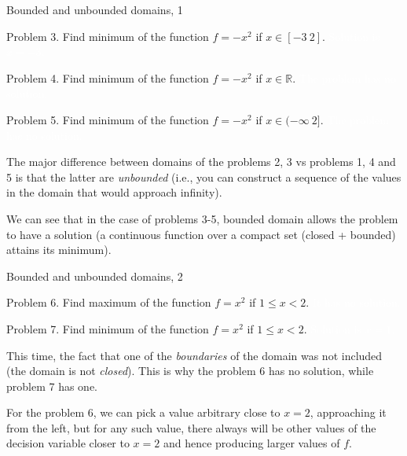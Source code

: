 \documentclass{beamer}
\begin{document}
\begin{frame}{Bounded and unbounded domains, 1}
	\begin{flushleft}
		
		Problem 3. Find minimum of the function $f = -x^2$ if $x \in [-3 \ 2]$. \textcolor{white}{Solution is $x = -3$.}
		
		\bigskip
		
		Problem 4. Find minimum of the function $f = -x^2$ if $x \in \mathbb{R}$. \textcolor{white}{The problem has no solution.}
		
		\bigskip
		
		Problem 5. Find minimum of the function $f = -x^2$ if $x \in  (-\infty \ 2]$. \textcolor{white}{The problem has no solution.}
		
		\bigskip
		
		The major difference between domains of the problems 2, 3 vs problems 1, 4 and 5 is that the latter are \emph{unbounded} (i.e., you can construct a sequence of the values in the domain that would approach infinity).
		
		\bigskip
		
		We can see that in the case of problems 3-5, bounded domain allows the problem to have a solution \textcolor{mygray}{(a continuous function over a compact set (closed + bounded) attains its minimum)}.
		
	\end{flushleft}
\end{frame}



\begin{frame}{Bounded and unbounded domains, 2}
	\begin{flushleft}
		
		Problem 6. Find maximum of the function $f = x^2$ if $1 \leq x < 2$. \textcolor{white}{It has no solution.}
		
		\bigskip
		
		Problem 7. Find minimum of the function $f = x^2$ if $1 \leq x < 2$. \textcolor{white}{Solution is $x = 1$.}
		
		\bigskip
		
		This time, the fact that one of the \emph{boundaries} of the domain was not included (the domain is not \emph{closed}). This is why the problem 6 has no solution, while problem 7 has one. 
		
		\bigskip
		
		For the problem 6,  we can pick a value arbitrary close to $x = 2$, approaching it from the left, but for any such value, there always will be other values of the decision variable closer to $x = 2$ and hence producing larger values of $f$.
		
	\end{flushleft}
\end{frame}
\end{document}
